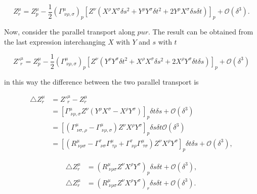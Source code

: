             \begin{equation}
                Z^{\mu}_r = Z^{\mu}_p - \frac{1}{2}\left(\Gamma^{\mu}_{\;\nu\rho,\sigma} \right)_p\left[Z^{\nu}\left(X^{\rho}X^{\sigma}\delta s^2 + Y^{\rho}Y^{\sigma}\delta t^2  + 2Y^{\rho}X^{\sigma}\delta s\delta t \right)\right]_p + \mathcal{O}(\delta ^3).
            \end{equation}

            Now, consider the parallel transport along $pur$. The result can be obtained from the last expression interchanging $X$ with $Y$ and $s$ with $t$

            \begin{equation}
                Z'^{\mu}_r = Z^{\mu}_p-\frac{1}{2}\left(\Gamma^{\mu}_{\;\nu\rho,\sigma} \right)_p\left[Z^{\nu}\left(Y^{\rho}Y^{\sigma}\delta t^2 + X^{\rho}X^{\sigma}\delta s^2 + 2X^{\rho}Y^{\sigma}\delta t \delta s \right) \right]_p + \mathcal{O}(\delta^3)
            \end{equation}

            in this way the difference between the two parallel transport is

            \begin{align}
                \triangle Z^{\mu}_r &= Z'^{\mu}_r - Z^{\mu}_r\\
                &= \left[\Gamma^{\mu}_{\;\nu\rho,\sigma}Z^{\nu}\left(Y^{\rho}X^{\sigma} - X^{\rho}Y^{\sigma} \right) \right]_p\delta t \delta s + \mathcal{O}(\delta^3)\\
                &= \left[\left(\Gamma^{\mu}_{\;\nu\sigma,\rho} - \Gamma^{\mu}_{\;\nu\rho,\sigma} \right)Z^{\nu}X^{\rho}Y^{\sigma} \right]_p\delta s \delta t 
                 \mathcal{O}(\delta^3)\\
                 &= \left[\left(R^{\mu}_{\;\nu\rho\sigma} - \Gamma^{\tau}_{\;\nu\sigma}\Gamma^{\mu}_{\;\tau\rho} + \Gamma^{\tau}_{\;\nu\rho}\Gamma^{\mu}_{\;\tau\sigma} \right)Z^{\nu}X^{\rho}Y^{\sigma} \right]_p\delta t \delta s + \mathcal{O}(\delta^3),
            \end{align}

            \begin{align}
                \triangle Z^{\mu}_r &= \left(R^{\mu}_{\;\nu\rho\sigma}Z^{\nu}X^{\rho}Y^{\sigma} \right)_p\delta s \delta t + \mathcal{O}(\delta^3),\\
                \triangle Z^{\mu}_r &= \left(R^{\mu}_{\;\nu\rho\sigma}Z^{\nu}X^{\rho}Y^{\sigma} \right)_r\delta s \delta t + \mathcal{O}(\delta^3).
            \end{align}

